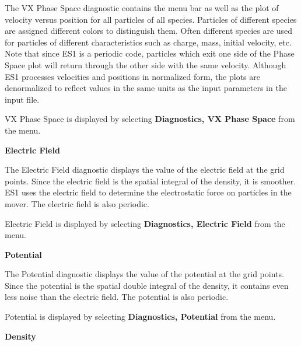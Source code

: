 \begin{section}
\begin{subsection}
\begin{subsubsection}
      The VX Phase Space diagnostic contains the menu bar as well as the plot
      of velocity versus position for all particles of all species.  Particles
      of different species are assigned different colors to distinguish them.
      Often different species are used for particles of different
      characteristics such as charge, mass, initial velocity, etc.  Note that
      since ES1 is a periodic code, particles which exit one side of the Phase
      Space plot will return through the other side with the same velocity.
      Although ES1 processes velocities and positions in normalized form, the
      plots are denormalized to reflect values in the same units as the input
      parameters in the input file.
\vspace{.2in}

\noindent
      VX Phase Space is displayed by selecting 
      {\bf Diagnostics, VX Phase Space} from
      the menu.
\end{subsubsection}

\begin{subsubsection}
{\bf Electric Field}

      The Electric Field diagnostic displays the value of the electric field at
      the grid points.  Since the electric field is the spatial integral of the
      density, it is smoother.  ES1 uses the electric field to determine the
      electrostatic force on particles in the mover.  The electric field is
      also periodic.
\vspace{.2in}

\noindent
      Electric Field is displayed by selecting {\bf Diagnostics, Electric Field}
      from the menu.
\end{subsubsection}

\begin{subsubsection}
{\bf Potential}

      The Potential diagnostic displays the value of the potential at the grid
      points.  Since the potential is the spatial double integral of the
      density, it contains even less noise than the electric field.  The
      potential is also periodic.
\vspace{.2in}

\noindent
      Potential is displayed by selecting {\bf Diagnostics, Potential}
      from the menu.
\end{subsubsection}

\begin{subsubsection}
{\bf Density}


\end{subsubsection}
\end{subsection}
\end{section}
